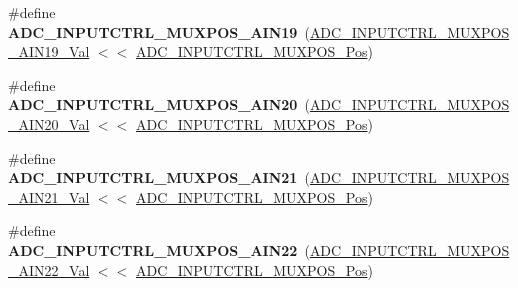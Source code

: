\begin{DoxyCompactItemize}
\item 
\hypertarget{group___s_a_m_l21___a_d_c_gacac5b74846bacb17f690ad008c73e4ce}{}\#define {\bfseries A\+D\+C\+\_\+\+I\+N\+P\+U\+T\+C\+T\+R\+L\+\_\+\+M\+U\+X\+P\+O\+S\+\_\+\+A\+I\+N19}~(\hyperlink{group___s_a_m_l21___a_d_c_ga135578a3e87f1618a959c85357e4a94f}{A\+D\+C\+\_\+\+I\+N\+P\+U\+T\+C\+T\+R\+L\+\_\+\+M\+U\+X\+P\+O\+S\+\_\+\+A\+I\+N19\+\_\+\+Val} $<$$<$ \hyperlink{group___s_a_m_l21___a_d_c_ga583868be285e1c06c9a93dfd552d8c6a}{A\+D\+C\+\_\+\+I\+N\+P\+U\+T\+C\+T\+R\+L\+\_\+\+M\+U\+X\+P\+O\+S\+\_\+\+Pos})\label{group___s_a_m_l21___a_d_c_gacac5b74846bacb17f690ad008c73e4ce}

\item 
\hypertarget{group___s_a_m_l21___a_d_c_gad60ed125e884e8ada2ebc7772e220088}{}\#define {\bfseries A\+D\+C\+\_\+\+I\+N\+P\+U\+T\+C\+T\+R\+L\+\_\+\+M\+U\+X\+P\+O\+S\+\_\+\+A\+I\+N20}~(\hyperlink{group___s_a_m_l21___a_d_c_ga26a5a3d36d0375f971b3261de71af223}{A\+D\+C\+\_\+\+I\+N\+P\+U\+T\+C\+T\+R\+L\+\_\+\+M\+U\+X\+P\+O\+S\+\_\+\+A\+I\+N20\+\_\+\+Val} $<$$<$ \hyperlink{group___s_a_m_l21___a_d_c_ga583868be285e1c06c9a93dfd552d8c6a}{A\+D\+C\+\_\+\+I\+N\+P\+U\+T\+C\+T\+R\+L\+\_\+\+M\+U\+X\+P\+O\+S\+\_\+\+Pos})\label{group___s_a_m_l21___a_d_c_gad60ed125e884e8ada2ebc7772e220088}

\item 
\hypertarget{group___s_a_m_l21___a_d_c_ga561c6ee11a957b4040ccde7cc9a20791}{}\#define {\bfseries A\+D\+C\+\_\+\+I\+N\+P\+U\+T\+C\+T\+R\+L\+\_\+\+M\+U\+X\+P\+O\+S\+\_\+\+A\+I\+N21}~(\hyperlink{group___s_a_m_l21___a_d_c_ga43e2078e0fc1fded2d257c6ed7a2de77}{A\+D\+C\+\_\+\+I\+N\+P\+U\+T\+C\+T\+R\+L\+\_\+\+M\+U\+X\+P\+O\+S\+\_\+\+A\+I\+N21\+\_\+\+Val} $<$$<$ \hyperlink{group___s_a_m_l21___a_d_c_ga583868be285e1c06c9a93dfd552d8c6a}{A\+D\+C\+\_\+\+I\+N\+P\+U\+T\+C\+T\+R\+L\+\_\+\+M\+U\+X\+P\+O\+S\+\_\+\+Pos})\label{group___s_a_m_l21___a_d_c_ga561c6ee11a957b4040ccde7cc9a20791}

\item 
\hypertarget{group___s_a_m_l21___a_d_c_ga2b33ed2d45139d7c681f494f8835ec0f}{}\#define {\bfseries A\+D\+C\+\_\+\+I\+N\+P\+U\+T\+C\+T\+R\+L\+\_\+\+M\+U\+X\+P\+O\+S\+\_\+\+A\+I\+N22}~(\hyperlink{group___s_a_m_l21___a_d_c_ga3e6d02357fe37cd29c32bb6f9e8fa2b9}{A\+D\+C\+\_\+\+I\+N\+P\+U\+T\+C\+T\+R\+L\+\_\+\+M\+U\+X\+P\+O\+S\+\_\+\+A\+I\+N22\+\_\+\+Val} $<$$<$ \hyperlink{group___s_a_m_l21___a_d_c_ga583868be285e1c06c9a93dfd552d8c6a}{A\+D\+C\+\_\+\+I\+N\+P\+U\+T\+C\+T\+R\+L\+\_\+\+M\+U\+X\+P\+O\+S\+\_\+\+Pos})\label{group___s_a_m_l21___a_d_c_ga2b33ed2d45139d7c681f494f8835ec0f}


\end{DoxyCompactItemize}
